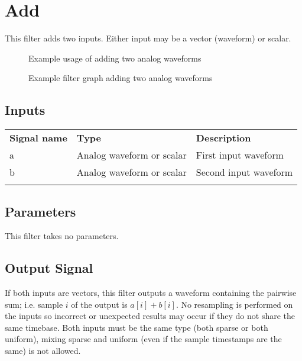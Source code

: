 \pagebreak
\section{Add}
\label{filter:add}

This filter adds two inputs. Either input may be a vector (waveform) or scalar.

\begin{figure}[h]
\centering
{}
\caption{Example usage of adding two analog waveforms}
\label{filter_add}
\end{figure}

\begin{figure}[h]
\centering
{}
\caption{Example filter graph adding two analog waveforms}
\label{filter_graph_add}
\end{figure}
\FloatBarrier
\subsection{Inputs}

\begin{tabularx}{16cm}{llX}
\thickhline
\textbf{Signal name} & \textbf{Type} & \textbf{Description} \\
\thickhline
a & Analog waveform or scalar & First input waveform\\
\thinhline
b & Analog waveform or scalar & Second input waveform\\
\thickhline
\end{tabularx}

\subsection{Parameters}

This filter takes no parameters.

\subsection{Output Signal}

If both inputs are vectors, this filter outputs a waveform containing the pairwise sum; i.e. sample $i$ of the output
is $a[i] + b[i]$. No resampling is performed on the inputs so incorrect or unexpected results may occur if they do not
share the same timebase. Both inputs must be the same type (both sparse or both uniform), mixing sparse and uniform
(even if the sample timestamps are the same) is not allowed.

